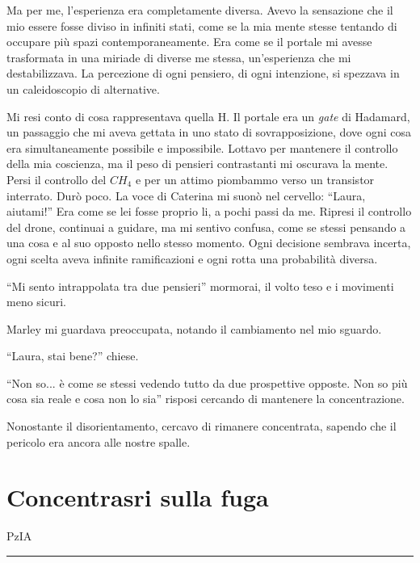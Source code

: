 Ma per me, l'esperienza era completamente diversa. Avevo la sensazione che il mio essere fosse diviso in infiniti stati, come se la mia mente stesse tentando di occupare più spazi contemporaneamente. Era come se il portale mi avesse trasformata in una miriade di diverse me stessa, un'esperienza che mi destabilizzava. La percezione di ogni pensiero, di ogni intenzione, si spezzava in un caleidoscopio di alternative.

Mi resi conto di cosa rappresentava quella H. Il portale era un \textit{gate} di Hadamard, un passaggio che mi aveva gettata in uno stato di sovrapposizione, dove ogni cosa era simultaneamente possibile e impossibile. Lottavo per mantenere il controllo della mia coscienza, ma il peso di pensieri contrastanti mi oscurava la mente.
Persi il controllo del $CH_4$ e per un attimo piombammo verso un transistor interrato. Durò poco. La voce di Caterina mi suonò nel cervello: ``Laura, aiutami!'' Era come se lei fosse proprio li, a pochi passi da me.
Ripresi il controllo del drone, continuai a guidare, ma mi sentivo confusa, come se stessi pensando a una cosa e al suo opposto nello stesso momento. Ogni decisione sembrava incerta,  ogni scelta aveva infinite ramificazioni e ogni rotta una probabilità diversa.

\begin{dialogue}
 \enquote{Mi sento intrappolata tra due pensieri} mormorai, il volto teso e i movimenti meno sicuri.
\end{dialogue}

Marley mi guardava preoccupata, notando il cambiamento nel mio sguardo.

\begin{dialogue}
 \enquote{Laura, stai bene?} chiese.
\end{dialogue}

\begin{dialogue}
 \enquote{Non so... è come se stessi vedendo tutto da due prospettive opposte. Non so più cosa sia reale e cosa non lo sia} risposi cercando di mantenere la concentrazione.
\end{dialogue}

Nonostante il disorientamento, cercavo di rimanere concentrata, sapendo che il pericolo era ancora alle nostre spalle.
\newpage
\section{Concentrasri sulla fuga}
\vspace{1em}
\begin{center}PzIA\end{center}
\hrule
\vspace{1em}

